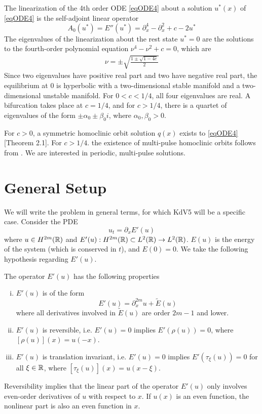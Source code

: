 \documentclass[thesis.tex]{subfiles}
\begin{document}
The linearization of the 4th order ODE \eqref{eqODE4} about a solution $u^*(x)$ of \eqref{eqODE4} is the self-adjoint linear operator
\begin{equation}\label{defA0}
A_0(u^*) = E''(u^*) = \partial_x^4 - \partial_x^2 + c - 2 u^* 
\end{equation}
The eigenvalues of the linearization about the rest state $u^* = 0$ are the solutions to the fourth-order polynomial equation $\nu^4 - \nu^2 + c = 0$, which are
\begin{align}\label{specA0}
\nu = \pm \sqrt{ \frac{1 \pm \sqrt{1 - 4c} }{2}}
\end{align}
Since two eigenvalues have positive real part and two have negative real part, the equilibrium at 0 is hyperbolic with a two-dimensional stable manifold and a two-dimensional unstable manifold. For $0 < c < 1/4$, all four eigenvalues are real. A bifurcation takes place at $c = 1/4$, and for $c > 1/4$, there is a quartet of eigenvalues of the form $\pm \alpha_0 \pm \beta_0 i$, where $\alpha_0, \beta_0 > 0$.

For $c > 0$, a symmetric homoclinic orbit solution $q(x)$ exists to \eqref{eqODE4} \cite{Pelinovsky2007}[Theorem 2.1]. For $c > 1/4$. the existence of multi-pulse homoclinic orbits follows from \cite{SandstedeStrut}. We are interested in periodic, multi-pulse solutions.

\section{General Setup}

We will write the problem in general terms, for which KdV5 will be a specific case. Consider the PDE
\begin{equation}\label{genPDE}
u_t = \partial_x E'(u)
\end{equation}
where $u \in H^{2m}({\mathbb R})$ and $E'(u): H^{2m}({\mathbb R}) \subset L^2({\mathbb R}) \rightarrow L^2({\mathbb R})$. $E(u)$ is the energy of the system (which is conserved in $t$), and $E(0) = 0$. We take the following hypothesis regarding $E'(u)$.

\begin{hypothesis}\label{Eprimehyp}
The operator $E'(u)$ has the following properties
\begin{enumerate}[(i)]
\item $E'(u)$ is of the form
\begin{equation}\label{Eprimeuform}
E'(u) = \partial_x^{2m}u + \tilde{E}(u)
\end{equation}
where all derivatives involved in $\tilde{E}(u)$ are order $2m-1$ and lower.
\item $E'(u)$ is reversible, i.e. $E'(u) = 0$ implies $E'(\rho(u)) = 0$,
where $[\rho(u)](x) = u(-x)$.
\item $E'(u)$ is translation invariant, i.e. $E'(u) = 0$ implies $E'(\tau_\xi(u)) = 0$ for all $\xi \in {\mathbb R}$, where $[\tau_\xi(u)](x) = u(x - \xi)$.
\end{enumerate}
\end{hypothesis}
Reversibility implies that the linear part of the operator $E'(u)$ only involves even-order derivatives of $u$ with respect to $x$. If $u(x)$ is an even function, the nonlinear part is also an even function in $x$.
\end{document}
